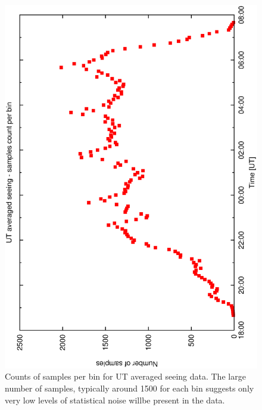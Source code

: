 {{\begin{figure}[htbp]
\begin{center}
    \includegraphics[scale=0.4, angle=-90]{figures/ecs/ut_bin_counts.eps}
\end{center} 
\caption[Counts of samples per bin for UT averaged seeing data.]
{Counts of samples per bin for UT averaged seeing data. The large number of samples, typically around 1500 for each bin suggests only very low levels of statistical noise willbe present in the data.}
\label{fig:ut_bin_count}
\end{figure}




}}
